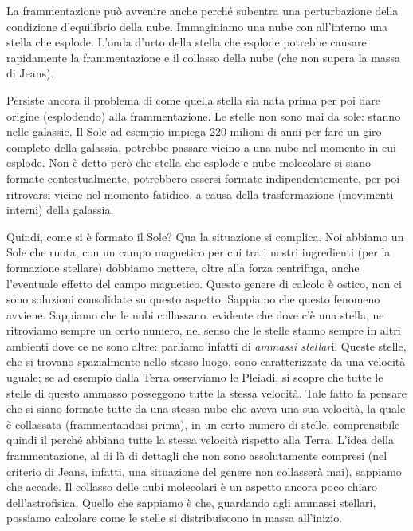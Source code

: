 La frammentazione può avvenire anche perché subentra una perturbazione della condizione d'equilibrio della nube. Immaginiamo una nube con all'interno una stella che esplode. L'onda d'urto della stella che esplode potrebbe causare rapidamente la frammentazione e il collasso della nube (che non supera la massa di Jeans).

Persiste ancora il problema di come quella stella sia nata prima per poi dare origine (esplodendo) alla frammentazione. Le stelle non sono mai da sole: stanno nelle galassie. Il Sole ad esempio impiega 220 milioni di anni per fare un giro completo della galassia, potrebbe passare vicino a una nube nel momento in cui esplode. Non è detto però che stella che esplode e nube molecolare si siano formate contestualmente, potrebbero essersi formate indipendentemente, per poi ritrovarsi vicine nel momento fatidico, a causa della trasformazione (movimenti interni) della galassia.

Quindi, come si è formato il Sole? Qua la situazione si complica. Noi abbiamo un Sole che ruota, con un campo magnetico per cui tra i nostri ingredienti (per la formazione stellare) dobbiamo mettere, oltre alla forza centrifuga, anche l'eventuale effetto del campo magnetico. Questo genere di calcolo è ostico, non ci sono soluzioni consolidate su questo aspetto. Sappiamo che questo fenomeno avviene. Sappiamo che le nubi collassano. \E evidente che dove c'è una stella, ne ritroviamo sempre un certo numero, nel senso che le stelle stanno sempre in altri ambienti dove ce ne sono altre: parliamo infatti di \textit{ammassi stellar}i. Queste stelle, che si trovano spazialmente nello stesso luogo, sono caratterizzate da una velocità uguale; se ad esempio dalla Terra osserviamo le Pleiadi, si scopre che tutte le stelle di questo ammasso posseggono tutte la stessa velocità. Tale fatto fa pensare che si siano formate tutte da una stessa nube che aveva una sua velocità, la quale è collassata (frammentandosi prima), in un certo numero di stelle. \E comprensibile quindi il perché abbiano tutte la stessa velocità rispetto alla Terra. L'idea della frammentazione, al di là di dettagli che non sono assolutamente compresi (nel criterio di Jeans, infatti, una situazione del genere non collasserà mai), sappiamo che accade. Il collasso delle nubi molecolari è un aspetto ancora poco chiaro dell'astrofisica. Quello che sappiamo è che, guardando agli ammassi stellari, possiamo calcolare come le stelle si distribuiscono in massa all'inizio.

